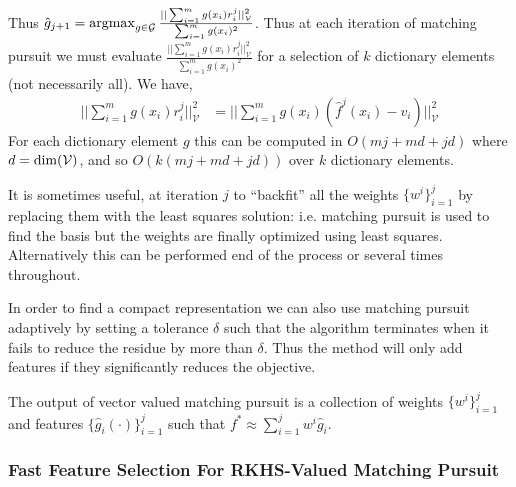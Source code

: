 \documentclass[letterpaper]{article}
\newcommand{\cV}{{\mathcal V}}
\newcommand{\cG}{{\mathcal G}}
\newcommand{\argmax}{\operatornamewithlimits{argmax}}
\newcommand{\nn}{\nonumber}
\begin{document}
Thus $\hat g_{j+1} = \argmax_{g\in\cG}  \frac{ ||\sum_{i=1}^m  g(x_i)  r^j_i  ||_\cV^2 }{ \sum_{i=1}^m  g(x_i)^2 }$. Thus at each iteration of matching pursuit we must evaluate $\frac{ ||\sum_{i=1}^m  g(x_i)  r^j_i  ||_\cV^2 }{ \sum_{i=1}^m  g(x_i)^2 }$ for a selection of $k$ dictionary elements (not necessarily all). We have,
\begin{align}
 ||\sum_{i=1}^m  g(x_i)  r^j_i  ||_\cV^2  &=  ||\sum_{i=1}^m  g(x_i) (\hat f^j(x_i) - v_i)  ||_\cV^2 \nn
\end{align}
For each dictionary element $g$ this can be computed in $O(mj+md+jd)$ where $d={\rm dim}(\cV)$, and so $O(k(mj+md+jd))$ over $k$ dictionary elements.

It is sometimes useful, at iteration $j$ to ``backfit'' all the weights $\{w^i\}_{i=1}^j$ by replacing them with the least squares solution: i.e. matching pursuit is used to find the basis but the weights are finally optimized using least squares. Alternatively this can be performed end of the process or several times throughout.

In order to find a compact representation we can also use matching pursuit adaptively by setting a tolerance $\delta$ such that the algorithm terminates when it fails to reduce the residue by more than $\delta$. Thus the method will only add features if they significantly reduces the objective.

The output of vector valued matching pursuit is a collection of weights $\{w^i\}_{i=1}^j$ and features $\{ \hat g_i(\cdot) \}_{i=1}^j$ such that $f^* \approx \sum_{i=1}^j w^i \hat g_i$. 


\subsubsection{Fast Feature Selection For RKHS-Valued Matching Pursuit}
\end{document}
